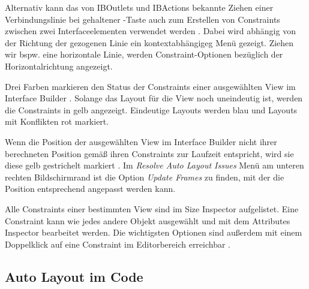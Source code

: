 \documentclass[parskip=half, final]{scrreprt}
\begin{document}
Alternativ kann das von IBOutlets und IBActions bekannte Ziehen einer Verbindungslinie bei gehaltener \keys{\ctrlkey}-Taste auch zum Erstellen von Constraints zwischen zwei Interfaceelementen verwendet werden . Dabei wird abhängig von der Richtung der gezogenen Linie ein kontextabhängigeg Menü gezeigt. Ziehen wir bspw. eine horizontale Linie, werden Constraint-Optionen bezüglich der Horizontalrichtung angezeigt.


Drei Farben markieren den Status der Constraints einer ausgewählten View im Interface Builder . Solange das Layout für die View noch uneindeutig ist, werden die Constraints in gelb angezeigt. Eindeutige Layouts werden blau und Layouts mit Konflikten rot markiert.


Wenn die Position der ausgewählten View im Interface Builder nicht ihrer berechneten Position gemäß ihren Constraints zur Laufzeit entspricht, wird sie diese gelb gestrichelt markiert . Im \emph{Resolve Auto Layout Issues} Menü am unteren rechten Bildschirmrand ist die Option \emph{Update Frames} zu finden, mit der die Position entsprechend angepasst werden kann.


Alle Constraints einer bestimmten View sind im Size Inspector aufgelistet. Eine Constraint kann wie jedes andere Objekt ausgewählt und mit dem Attributes Inspector bearbeitet werden. Die wichtigsten Optionen sind außerdem mit einem Doppelklick auf eine Constraint im Editorbereich erreichbar .


\subsection{Auto Layout im Code}
\end{document}
